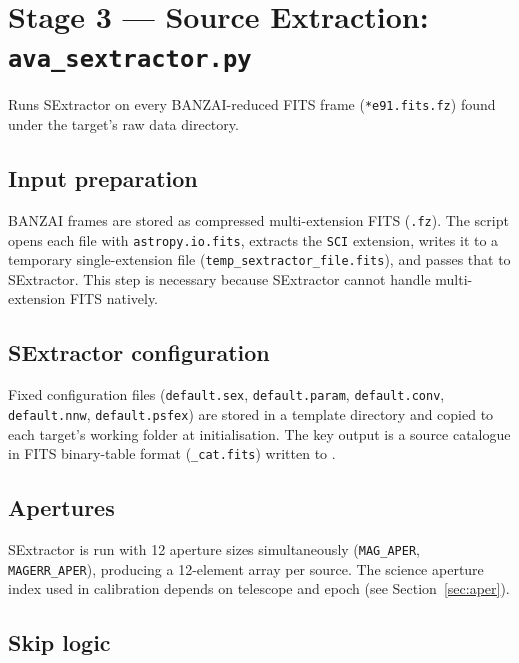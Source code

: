 \documentclass[12pt,a4paper]{article}
\begin{document}
\section{Stage 3 --- Source Extraction: \texorpdfstring{\texttt{ava\_sextractor.py}}{ava_sextractor.py}}
\label{sec:sextractor}

Runs SExtractor on every BANZAI-reduced FITS frame (\texttt{*e91.fits.fz}) found under
the target's raw data directory.

\subsection{Input preparation}

BANZAI frames are stored as compressed multi-extension FITS (\texttt{.fz}).  The script
opens each file with \texttt{astropy.io.fits}, extracts the \texttt{SCI} extension, writes
it to a temporary single-extension file (\texttt{temp\_\hspace{0pt}sextractor\_\hspace{0pt}file.fits}), and passes
that to SExtractor.  This step is necessary because SExtractor cannot handle
multi-extension FITS natively.

\subsection{SExtractor configuration}

Fixed configuration files (\texttt{default.sex}, \texttt{default.param},
\texttt{default.conv}, \texttt{default.nnw}, \texttt{default.psfex}) are stored in a
template directory and copied to each target's working folder at initialisation.  The key
output is a source catalogue in FITS binary-table format (\texttt{\_cat.fits}) written to
.

\subsection{Apertures}

SExtractor is run with 12 aperture sizes simultaneously (\texttt{MAG\_APER},
\texttt{MAGERR\_APER}), producing a 12-element array per source.  The science aperture
index used in calibration depends on telescope and epoch (see Section~\ref{sec:aper}).

\subsection{Skip logic}
\end{document}
